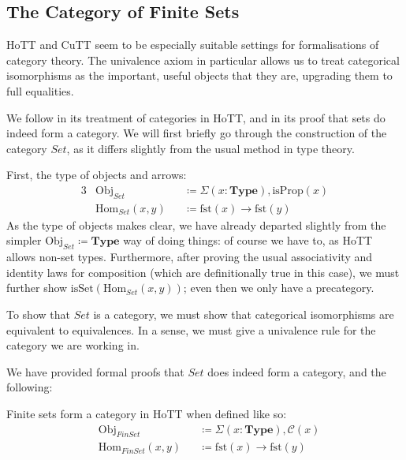 \subsection{The Category of Finite Sets}
HoTT and CuTT seem to be especially suitable settings for formalisations of
category theory.
The univalence axiom in particular allows us to treat categorical isomorphisms
as the important, useful objects that they are, upgrading them to full
equalities.

We follow \cite[chapter 9]{hottbook} in its treatment of
categories in HoTT, and in its proof that sets do indeed form a category.
We will first briefly go through the construction of the category
\(\mathit{Set}\), as it differs slightly from the usual method in type theory.

First, the type of objects and arrows:
\begin{alignat}{3}
  &\text{Obj}_\mathit{Set}      &&\coloneqq \Sigma(x : \mathbf{Type}) , \text{isProp}(x) \\
  &\text{Hom}_\mathit{Set}(x , y) &&\coloneqq  \text{fst}(x) \rightarrow \text{fst}(y)
\end{alignat}
As the type of objects makes clear, we have already departed slightly from the
simpler \(\text{Obj}_\mathit{Set} \coloneqq \mathbf{Type}\) way of doing things:
of course we have to, as HoTT allows non-set types.
Furthermore, after proving the usual associativity and identity laws for
composition (which are definitionally true in this case), we must further show
\(\text{isSet}(\text{Hom}_\mathit{Set}(x,y))\); even then we only have a
precategory.

To show that \(\mathit{Set}\) is a category, we must show that categorical
isomorphisms are equivalent to equivalences.
In a sense, we must give a univalence rule for the category we are working in.

We have provided formal proofs that \(\mathit{Set}\) does indeed form a
category, and the following:
\begin{romtheorem}
  Finite sets form a category in HoTT when defined like so:
  \begin{equation}
    \begin{aligned}
      &\text{Obj}_\mathit{FinSet}      &&\coloneqq \Sigma(x : \mathbf{Type}) , \mathcal{C}(x) \\
      &\text{Hom}_\mathit{FinSet}(x , y) &&\coloneqq  \text{fst}(x) \rightarrow \text{fst}(y)
    \end{aligned}
  \end{equation}
\end{romtheorem}
